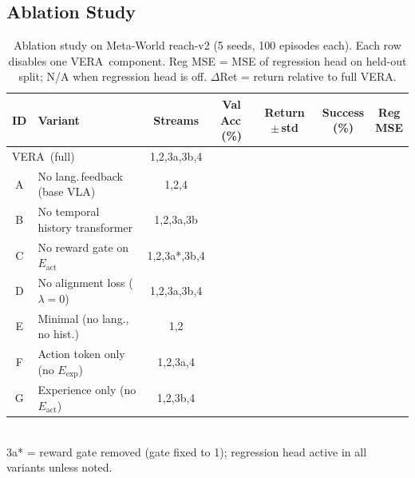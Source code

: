 \documentclass{article}
\newcommand{\modelname}{\textsc{VERA}\xspace}
\newcommand{\Lact}{$E_{\mathrm{act}}$\xspace}   %
\newcommand{\Lexp}{$E_{\mathrm{exp}}$\xspace}   %
\begin{document}
\subsection{Ablation Study}

\begin{table}[h]
\centering
\caption{Ablation study on Meta-World reach-v2 (5 seeds, 100 episodes each).
         Each row disables one \modelname\ component.
         Reg MSE = MSE of regression head on held-out split; N/A when regression head is off.
         $\Delta$Ret = return relative to full \modelname.}
\label{tab:ablations}
\small
\setlength{\tabcolsep}{4.5pt}
\begin{tabular}{clccccc}
\toprule
\textbf{ID} & \textbf{Variant} & \textbf{Streams}
            & \makecell{Val\\Acc\,(\%)}
            & \makecell{Return\\$\pm$\,std}
            & \makecell{Success\\(\%)}
            & \makecell{Reg\\MSE} \\
\midrule
\multicolumn{2}{l}{\modelname\ (full)} & 1,2,3a,3b,4
  & \text{---} & \text{---} & \text{---} & \text{---} \\
A & No lang.\,feedback (base VLA)    & 1,2,4
  & \text{---} & \text{---} & \text{---} & \text{---} \\
B & No temporal history transformer  & 1,2,3a,3b
  & \text{---} & \text{---} & \text{---} & \text{---} \\
C & No reward gate on \Lact          & 1,2,3a*,3b,4
  & \text{---} & \text{---} & \text{---} & \text{---} \\
D & No alignment loss ($\lambda{=}0$)& 1,2,3a,3b,4
  & \text{---} & \text{---} & \text{---} & \text{---} \\
E & Minimal (no lang., no hist.)     & 1,2
  & \text{---} & \text{---} & \text{---} & \text{---} \\
F & Action token only (no \Lexp)     & 1,2,3a,4
  & \text{---} & \text{---} & \text{---} & \text{---} \\
G & Experience only (no \Lact)       & 1,2,3b,4
  & \text{---} & \text{---} & \text{---} & \text{---} \\
\bottomrule
\end{tabular}
\vspace{2pt}\\
\footnotesize
3a* = reward gate removed (gate fixed to 1); regression head active in all variants unless noted.
\end{table}
\end{document}
